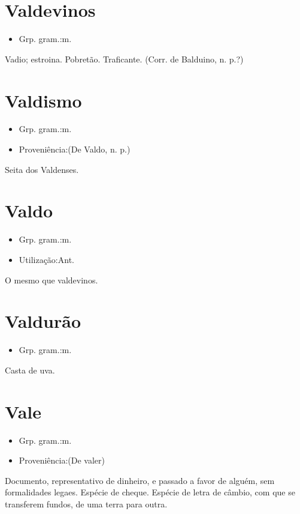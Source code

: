 \documentclass{article}
\begin{document}
\section{Valdevinos}
\begin{itemize}
\item {Grp. gram.:m.}
\end{itemize}
Vadio; estroina.
Pobretão.
Traficante.
(Corr. de \textunderscore Balduino\textunderscore , n. p.?)
\section{Valdismo}
\begin{itemize}
\item {Grp. gram.:m.}
\end{itemize}
\begin{itemize}
\item {Proveniência:(De \textunderscore Valdo\textunderscore , n. p.)}
\end{itemize}
Seita dos Valdenses.
\section{Valdo}
\begin{itemize}
\item {Grp. gram.:m.}
\end{itemize}
\begin{itemize}
\item {Utilização:Ant.}
\end{itemize}
O mesmo que \textunderscore valdevinos\textunderscore .
\section{Valdurão}
\begin{itemize}
\item {Grp. gram.:m.}
\end{itemize}
Casta de uva.
\section{Vale}
\begin{itemize}
\item {Grp. gram.:m.}
\end{itemize}
\begin{itemize}
\item {Proveniência:(De \textunderscore valer\textunderscore )}
\end{itemize}
Documento, representativo de dinheiro, e passado a favor de alguém, sem formalidades legaes.
Espécie de cheque.
Espécie de letra de câmbio, com que se transferem fundos, de uma terra para outra.
\end{document}
